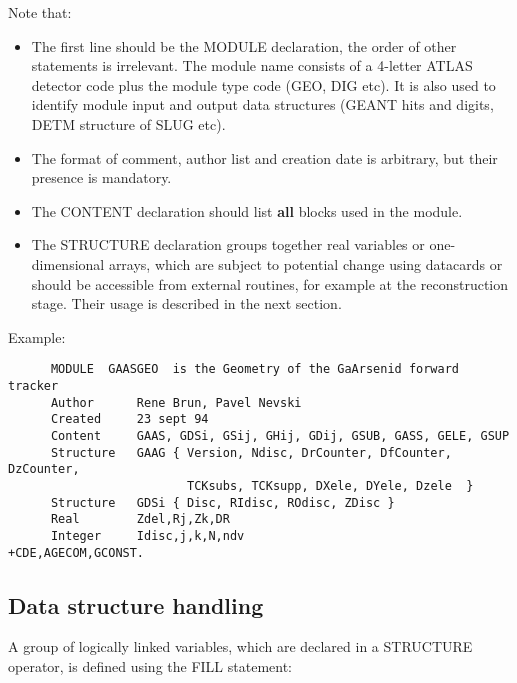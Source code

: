 Note that:
\begin{itemize}
\item
   The first line should be the MODULE declaration,
  the order of other statements is irrelevant.
  The module name consists of a 4-letter ATLAS detector code 
  plus the module type code (GEO, DIG etc). 
  It is also used to identify  module input and output data
  structures (GEANT hits and digits, DETM structure of SLUG etc).
\item
  The format of comment,  author list and creation date is arbitrary,
  but their presence is  mandatory.
\item
  The CONTENT declaration should list {\bf all} blocks used in the module.
\item
  The STRUCTURE declaration groups together real variables 
  or one-dimensional arrays, which are subject to potential change 
  using datacards
  or should be accessible from  external routines, 
  for example at the reconstruction stage.
  Their usage is described in the next section.
\end{itemize}
 
\vspace{0.3cm}  Example:
\begin{verbatim}
      MODULE  GAASGEO  is the Geometry of the GaArsenid forward tracker
      Author      Rene Brun, Pavel Nevski
      Created     23 sept 94
      Content     GAAS, GDSi, GSij, GHij, GDij, GSUB, GASS, GELE, GSUP
      Structure   GAAG { Version, Ndisc, DrCounter, DfCounter, DzCounter,
                         TCKsubs, TCKsupp, DXele, DYele, Dzele  }
      Structure   GDSi { Disc, RIdisc, ROdisc, ZDisc }
      Real        Zdel,Rj,Zk,DR
      Integer     Idisc,j,k,N,ndv
+CDE,AGECOM,GCONST.
\end{verbatim}
 
\subsection{Data structure handling}
 
A group of logically linked variables,
which are declared  in a  STRUCTURE operator,
is  defined  using the FILL statement:
 
